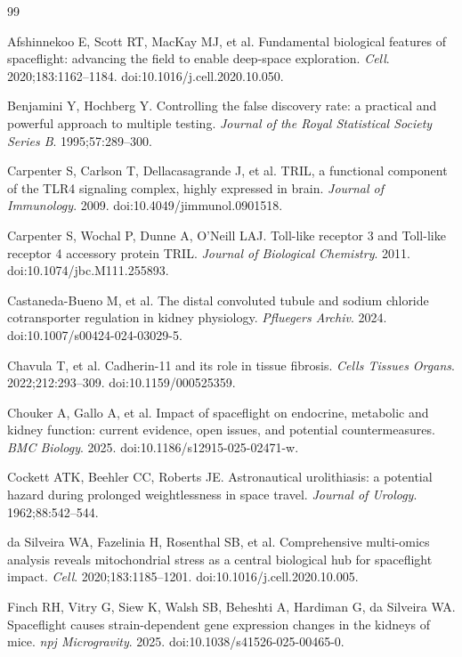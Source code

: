 \documentclass[11pt]{article}
\begin{document}
\begin{thebibliography}{99}\small

 Afshinnekoo E, Scott RT, MacKay MJ, et al. Fundamental biological features of spaceflight: advancing the field to enable deep-space exploration. \emph{Cell}. 2020;183:1162--1184. doi:10.1016/j.cell.2020.10.050.

 Benjamini Y, Hochberg Y. Controlling the false discovery rate: a practical and powerful approach to multiple testing. \emph{Journal of the Royal Statistical Society Series B}. 1995;57:289--300.

 Carpenter S, Carlson T, Dellacasagrande J, et al. TRIL, a functional component of the TLR4 signaling complex, highly expressed in brain. \emph{Journal of Immunology}. 2009. doi:10.4049/jimmunol.0901518.

 Carpenter S, Wochal P, Dunne A, O'Neill LAJ. Toll-like receptor 3 and Toll-like receptor 4 accessory protein TRIL. \emph{Journal of Biological Chemistry}. 2011. doi:10.1074/jbc.M111.255893.

 Castaneda-Bueno M, et al. The distal convoluted tubule and sodium chloride cotransporter regulation in kidney physiology. \emph{Pfluegers Archiv}. 2024. doi:10.1007/s00424-024-03029-5.

 Chavula T, et al. Cadherin-11 and its role in tissue fibrosis. \emph{Cells Tissues Organs}. 2022;212:293--309. doi:10.1159/000525359.

 Chouker A, Gallo A, et al. Impact of spaceflight on endocrine, metabolic and kidney function: current evidence, open issues, and potential countermeasures. \emph{BMC Biology}. 2025. doi:10.1186/s12915-025-02471-w.

 Cockett ATK, Beehler CC, Roberts JE. Astronautical urolithiasis: a potential hazard during prolonged weightlessness in space travel. \emph{Journal of Urology}. 1962;88:542--544.

 da Silveira WA, Fazelinia H, Rosenthal SB, et al. Comprehensive multi-omics analysis reveals mitochondrial stress as a central biological hub for spaceflight impact. \emph{Cell}. 2020;183:1185--1201. doi:10.1016/j.cell.2020.10.005.

 Finch RH, Vitry G, Siew K, Walsh SB, Beheshti A, Hardiman G, da Silveira WA. Spaceflight causes strain-dependent gene expression changes in the kidneys of mice. \emph{npj Microgravity}. 2025. doi:10.1038/s41526-025-00465-0.


\end{thebibliography}
\end{document}
